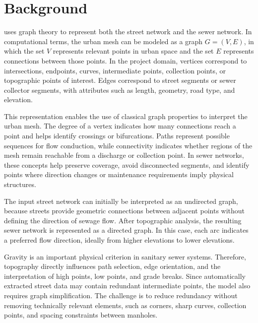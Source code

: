 \section{Background}\label{sec:background}

\method uses graph theory to represent both the street network and the sewer network.
In computational terms, the urban mesh can be modeled as a graph $G=(V,E)$, in which the set $V$ represents relevant points in urban space and the set $E$ represents connections between those points.
In the project domain, vertices correspond to intersections, endpoints, curves, intermediate points, collection points, or topographic points of interest.
Edges correspond to street segments or sewer collector segments, with attributes such as length, geometry, road type, and elevation.

This representation enables the use of classical graph properties to interpret the urban mesh.
The degree of a vertex indicates how many connections reach a point and helps identify crossings or bifurcations.
Paths represent possible sequences for flow conduction, while connectivity indicates whether regions of the mesh remain reachable from a discharge or collection point.
In sewer networks, these concepts help preserve coverage, avoid disconnected segments, and identify points where direction changes or maintenance requirements imply physical structures.

The input street network can initially be interpreted as an undirected graph, because streets provide geometric connections between adjacent points without defining the direction of sewage flow.
After topographic analysis, the resulting sewer network is represented as a directed graph.
In this case, each arc indicates a preferred flow direction, ideally from higher elevations to lower elevations.

Gravity is an important physical criterion in sanitary sewer systems.
Therefore, topography directly influences path selection, edge orientation, and the interpretation of high points, low points, and grade breaks.
Since automatically extracted street data may contain redundant intermediate points, the model also requires graph simplification.
The challenge is to reduce redundancy without removing technically relevant elements, such as corners, sharp curves, collection points, and spacing constraints between manholes.

